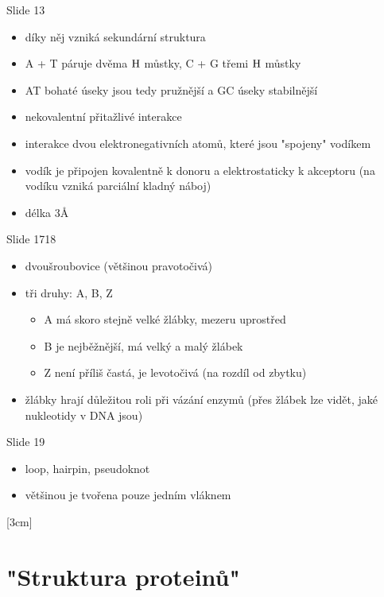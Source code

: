 \documentclass[DIV=8]{scrreprt}
\begin{document}
Slide 13
\begin{itemize}
    \item díky něj vzniká sekundární struktura
    \item A + T páruje dvěma \(\ce{H}\) můstky, C + G třemi \(\ce{H}\) můstky
    \item AT bohaté úseky jsou tedy pružnější a GC úseky stabilnější
\end{itemize}


\begin{itemize}
    \item nekovalentní přitažlivé interakce
    \item interakce dvou elektronegativních atomů, které jsou "spojeny" vodíkem
    \item vodík je připojen kovalentně k donoru a elektrostaticky k akceptoru (na vodíku vzniká parciální kladný náboj)
    \item délka 3Å
\end{itemize}


Slide 1718
\begin{itemize}
    \item dvoušroubovice (většinou pravotočivá)
    \item tři druhy: A, B, Z
\begin{itemize}
    \item A má skoro stejně velké žlábky, mezeru uprostřed
    \item B je nejběžnější, má velký a malý žlábek
    \item Z není příliš častá, je levotočivá (na rozdíl od zbytku)
\end{itemize}

    \item žlábky hrají důležitou roli při vázání enzymů (přes žlábek lze vidět, jaké nukleotidy v DNA jsou)
\end{itemize}


Slide 19
\begin{itemize}
    \item loop, hairpin, pseudoknot
    \item většinou je tvořena pouze jedním vláknem
\end{itemize}



[3cm]

\chapter{"Struktura proteinů"}
\end{document}
